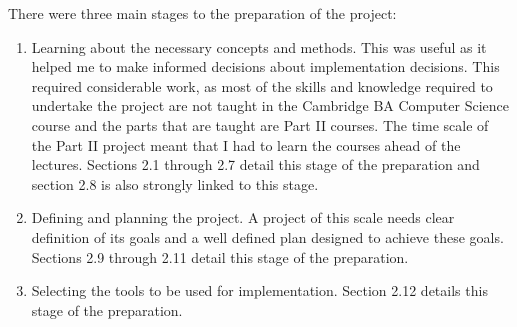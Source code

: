 \documentclass[12pt,a4paper,twoside,openright]{report}
\begin{document}
\begin{comment}
Principally, this chapter should describe the work which was undertaken before code was written, hardware built or theories worked on. It should show how the project proposal was further refined and clarified, so that the Implementation stage could go smoothly rather than by trial and error.

Throughout this chapter and indeed the whole dissertation, it is essential to demonstrate that a proper professional approach was employed.

The nature of this chapter will vary greatly from one dissertation to another but, underlining the professional approach, this chapter will very likely include a section headed “Requirements Analysis” and incorporate other references to software engineering techniques.

The chapter will cite any new programming languages and systems which had to be learnt and will mention complicated theories or algorithms which required understanding.

It is essential to declare the Starting Point (see Section 7). This states any existing codebase or materials that your project builds on. The text here can commonly be identical to the text in your proposal, but it may enlarge on it or report variations. For instance, the true starting point may have turned out to be different from that declared in the proposal and such discrepancies must be explained.
\end{comment}

There were three main stages to the preparation of the project:
\begin{enumerate}
	\item Learning about the necessary concepts and methods. This was useful as it helped me to make informed decisions about implementation decisions. This required considerable work, as most of the skills and knowledge required to undertake the project are not taught in the Cambridge BA Computer Science course and the parts that are taught are Part II courses. The time scale of the Part II project meant that I had to learn the courses ahead of the lectures. Sections 2.1 through 2.7 detail this stage of the preparation and section 2.8 is also strongly linked to this stage.
	\item Defining and planning the project. A project of this scale needs clear definition of its goals and a well defined plan designed to achieve these goals. Sections 2.9 through 2.11 detail this stage of the preparation.
	\item Selecting the tools to be used for implementation. Section 2.12 details this stage of the preparation.
\end{enumerate}
\end{document}
